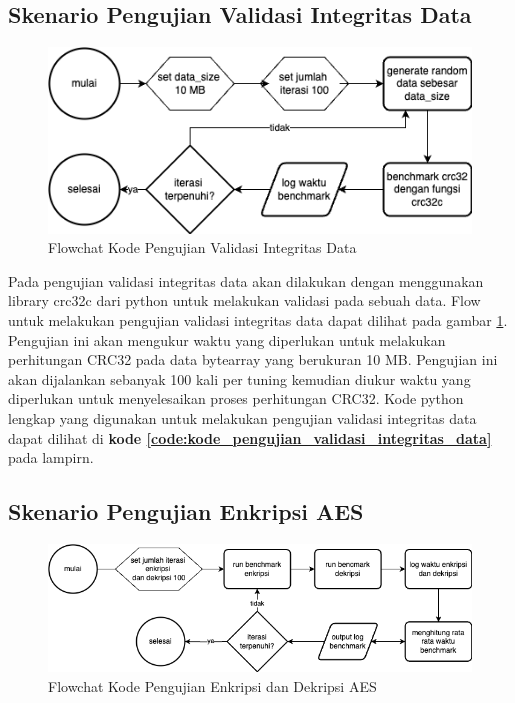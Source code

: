 \subsection{Skenario Pengujian Validasi Integritas Data}
\begin{figure}
    \centering
    \includegraphics[width=1\textwidth]
    {assets/pics/code-flowchart/flowchart_crc32.png}
    \caption{Flowchat Kode Pengujian Validasi Integritas Data}
    \label{fig:flowchart_crc32}
\end{figure}

Pada pengujian validasi integritas data akan dilakukan dengan menggunakan library crc32c dari python untuk melakukan validasi pada sebuah data. Flow untuk melakukan pengujian validasi integritas data dapat dilihat pada gambar \ref{fig:flowchart_crc32}. Pengujian ini akan mengukur waktu yang diperlukan untuk melakukan perhitungan CRC32 pada data bytearray yang berukuran 10 MB. Pengujian ini akan dijalankan sebanyak 100 kali per tuning kemudian diukur waktu yang diperlukan untuk menyelesaikan proses perhitungan CRC32. Kode python lengkap yang digunakan untuk melakukan pengujian validasi integritas data dapat dilihat di \textbf{kode \ref{code:kode_pengujian_validasi_integritas_data}} pada lampirn.

\subsection{Skenario Pengujian Enkripsi AES}
\begin{figure}
    \centering
    \includegraphics[width=1\textwidth]
    {assets/pics/code-flowchart/flowchart_aes.png}
    \caption{Flowchat Kode Pengujian Enkripsi dan Dekripsi AES}
    \label{fig:flowchart_aes}
\end{figure}

